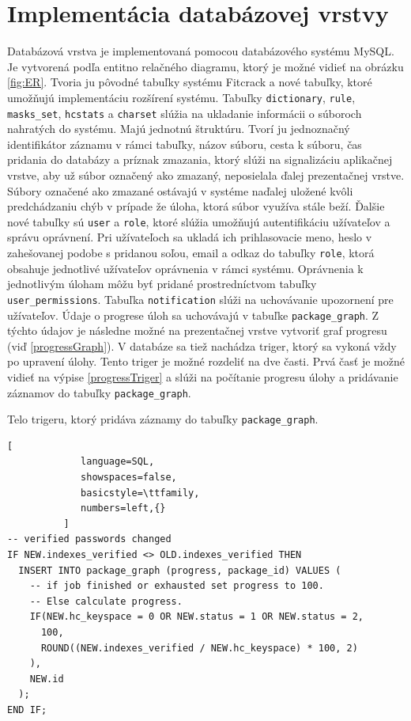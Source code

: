 \documentclass[slovak]{fitthesis}
\begin{document}
\section{Implementácia databázovej vrstvy}
Databázová vrstva je implementovaná pomocou databázového systému MySQL. Je vytvorená podľa entitno relačného diagramu, ktorý je možné vidieť na obrázku \ref{fig:ER}. Tvoria ju pôvodné tabuľky systému Fitcrack a nové tabuľky, ktoré umožňujú implementáciu rozšírení systému. Tabuľky \texttt{dictionary}, \texttt{rule}, \texttt{masks\_set}, \texttt{hcstats} a \texttt{charset} slúžia na ukladanie informácii o súboroch nahratých do systému. Majú jednotnú štruktúru. Tvorí ju jednoznačný identifikátor záznamu v rámci tabuľky, názov súboru, cesta k súboru, čas pridania do databázy a príznak zmazania, ktorý slúži na signalizáciu aplikačnej vrstve, aby už súbor označený ako zmazaný, neposielala ďalej prezentačnej vrstve. Súbory označené ako zmazané ostávajú v systéme naďalej uložené kvôli predchádzaniu chýb v prípade že úloha, ktorá súbor využíva stále beží. Ďalšie nové tabuľky sú \texttt{user} a \texttt{role}, ktoré slúžia umožňujú autentifikáciu užívateľov a správu oprávnení. Pri užívateľoch sa ukladá ich prihlasovacie meno, heslo v zahešovanej podobe s pridanou soľou, email a odkaz do tabuľky \texttt{role}, ktorá obsahuje jednotlivé užívateľov oprávnenia v rámci systému. Oprávnenia k jednotlivým úloham môžu byť pridané prostredníctvom tabuľky \texttt{user\_permissions}. Tabuľka \texttt{notification} slúži na uchovávanie upozornení pre užívateľov. Údaje o progrese úloh sa uchovávajú v tabuľke \texttt{package\_graph}. Z týchto údajov je následne možné na prezentačnej vrstve vytvoriť graf progresu (viď \ref{progressGraph}). V databáze sa tiež nachádza triger, ktorý sa vykoná vždy po upravení úlohy. Tento triger je možné rozdeliť na dve časti. Prvá časť je možné vidieť na výpise \ref{progressTriger} a slúži na počítanie progresu úlohy a pridávanie záznamov do tabuľky \texttt{package\_graph}.
\begin{algorithm}
  \caption{Telo trigeru, ktorý pridáva záznamy do tabuľky \texttt{package\_graph}.}
  \label{progressTriger}
  \begin{lstlisting}[
             language=SQL,
             showspaces=false,
             basicstyle=\ttfamily,
             numbers=left,{}
          ]
-- verified passwords changed
IF NEW.indexes_verified <> OLD.indexes_verified THEN
  INSERT INTO package_graph (progress, package_id) VALUES (
    -- if job finished or exhausted set progress to 100. 
    -- Else calculate progress.
    IF(NEW.hc_keyspace = 0 OR NEW.status = 1 OR NEW.status = 2,
      100,
      ROUND((NEW.indexes_verified / NEW.hc_keyspace) * 100, 2)
    ),
    NEW.id  
  );
END IF;
  \end{lstlisting}
\end{algorithm}
\end{document}
